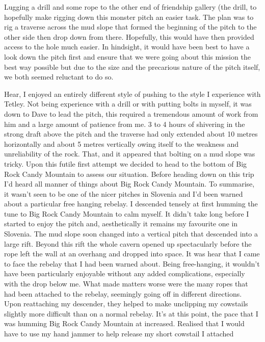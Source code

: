Lugging a drill and some rope to the other end of friendship gallery
(the drill, to hopefully make rigging down this monster pitch an easier
task. The plan was to rig a traverse across the mud slope that formed
the beginning of the pitch to the other side then drop down from there.
Hopefully, this would have then provided access to the hole much easier.
In hindsight, it would have been best to have a look down the pitch
first and ensure that we were going about this mission the best way
possible but due to the size and the precarious nature of the pitch
itself, we both seemed reluctant to do so.

Hear, I enjoyed an entirely different style of pushing to the style I
experience with Tetley. Not being experience with a drill or with
putting bolts in myself, it was down to Dave to lead the pitch, this
required a tremendous amount of work from him and a large amount of
patience from me. 3 to 4 hours of shivering in the strong draft above
the pitch and the traverse had only extended about 10 metres
horizontally and about 5 metres vertically owing itself to the weakness
and unreliability of the rock. That, and it appeared that bolting on a
mud slope was tricky. Upon this futile first attempt we decided to head
to the bottom of Big Rock Candy Mountain to assess our situation. Before
heading down on this trip I'd heard all manner of things about Big Rock
Candy Mountain. To summarise, it wasn't seen to be one of the nicer
pitches in Slovenia and I'd been warned about a particular free hanging
rebelay. I descended tensely at first humming the tune to Big Rock Candy
Mountain to calm myself. It didn't take long before I started to enjoy
the pitch and, aesthetically it remains my favourite one in Slovenia.
The mud slope soon changed into a vertical pitch that descended into a
large rift. Beyond this rift the whole cavern opened up spectacularly
before the rope left the wall at an overhang and dropped into space. It
was hear that I came to face the rebelay that I had been warned about.
Being free-hanging, it wouldn't have been particularly enjoyable without
any added complications, especially with the drop below me. What made
matters worse were the many ropes that had been attached to the rebelay,
seemingly going off in different directions. Upon reattaching my
descender, they helped to make unclipping my cowstails slightly more
difficult than on a normal rebelay. It's at this point, the pace that I
was humming Big Rock Candy Mountain at increased. Realised that I would
have to use my hand jammer to help release my short cowstail I attached
